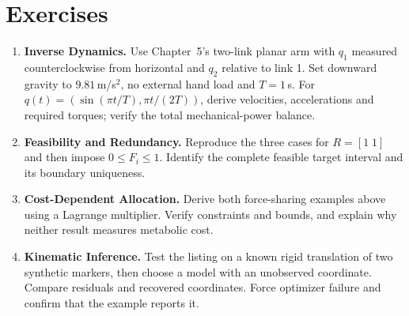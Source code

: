 \section*{Exercises}

\begin{enumerate}
 \item \textbf{Inverse Dynamics.} Use Chapter~5's two-link planar arm with
 $q_1$ measured counterclockwise from horizontal and $q_2$ relative to link 1.
 Set downward gravity to $9.81$\,m/s$^2$, no external hand load and $T=1$\,s.
 For $q(t)=(\sin(\pi t/T),\pi t/(2T))$, derive velocities, accelerations and
 required torques; verify the total mechanical-power balance.
 \item \textbf{Feasibility and Redundancy.} Reproduce the three cases for
 $R=[1\;1]$ and then impose $0\leq F_i\leq1$.
 Identify the complete feasible target interval and its boundary uniqueness.
 \item \textbf{Cost-Dependent Allocation.} Derive both force-sharing
 examples above using a Lagrange multiplier. Verify constraints and bounds,
 and explain why neither result measures metabolic cost.
 \item \textbf{Kinematic Inference.} Test the listing on a known rigid
 translation of two synthetic markers, then choose a model with an
 unobserved coordinate. Compare residuals and recovered coordinates.
 Force optimizer failure and confirm that the example reports it.
\end{enumerate}
